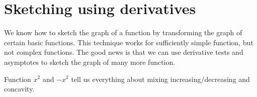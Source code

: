\documentclass[../main.tex]{subfiles}
\begin{document}
%
%
%
% 

\section{Sketching using derivatives}
We know how to sketch the graph of a function by transforming the graph of certain basic functions.  This technique works for sufficiently simple function, but not complex functions. The good news is that we can use derivative tests and asymptotes to sketch the graph of many more function.

Function \(x^{2}\) and \(-x^{2}\) tell us everything about mixing increasing/decreasing and concavity.

\begin{center}
  
  \qquad
  
\end{center}
\end{document}
